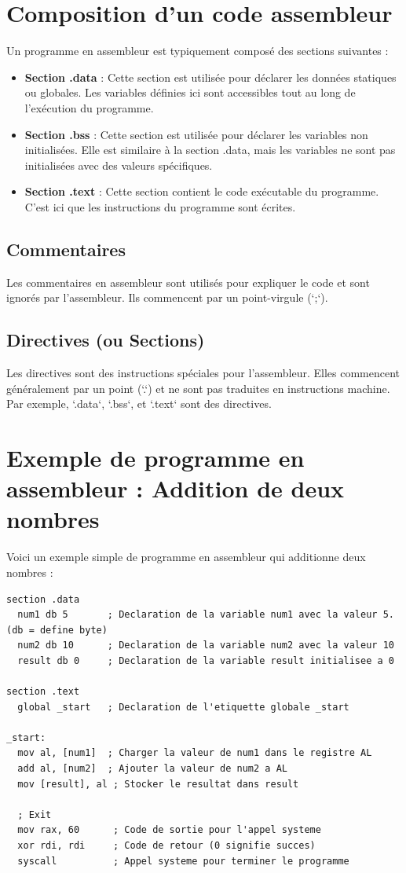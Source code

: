 \documentclass[a4paper, 12pt]{report}
\begin{document}
\section{Composition d'un code assembleur}
Un programme en assembleur est typiquement composé des sections suivantes :

\begin{itemize}
  \item \textbf{Section .data} : Cette section est utilisée pour déclarer les données statiques ou globales. Les variables définies ici sont accessibles tout au long de l'exécution du programme.
  \item \textbf{Section .bss} : Cette section est utilisée pour déclarer les variables non initialisées. Elle est similaire à la section .data, mais les variables ne sont pas initialisées avec des valeurs spécifiques.
  \item \textbf{Section .text} : Cette section contient le code exécutable du programme. C'est ici que les instructions du programme sont écrites.
\end{itemize}

\subsection{Commentaires}
Les commentaires en assembleur sont utilisés pour expliquer le code et sont ignorés par l'assembleur. Ils commencent par un point-virgule (`;`).

\subsection{Directives (ou Sections)}
Les directives sont des instructions spéciales pour l'assembleur. Elles commencent généralement par un point (`.`) et ne sont pas traduites en instructions machine. Par exemple, `.data`, `.bss`, et `.text` sont des directives.

\section{Exemple de programme en assembleur : Addition de deux nombres}
Voici un exemple simple de programme en assembleur qui additionne deux nombres :

\begin{lstlisting}[language={[x86masm]Assembler}]
section .data
  num1 db 5       ; Declaration de la variable num1 avec la valeur 5. (db = define byte)
  num2 db 10      ; Declaration de la variable num2 avec la valeur 10
  result db 0     ; Declaration de la variable result initialisee a 0

section .text
  global _start   ; Declaration de l'etiquette globale _start

_start:
  mov al, [num1]  ; Charger la valeur de num1 dans le registre AL
  add al, [num2]  ; Ajouter la valeur de num2 a AL
  mov [result], al ; Stocker le resultat dans result

  ; Exit
  mov rax, 60      ; Code de sortie pour l'appel systeme
  xor rdi, rdi     ; Code de retour (0 signifie succes)
  syscall          ; Appel systeme pour terminer le programme
\end{lstlisting}
\end{document}
